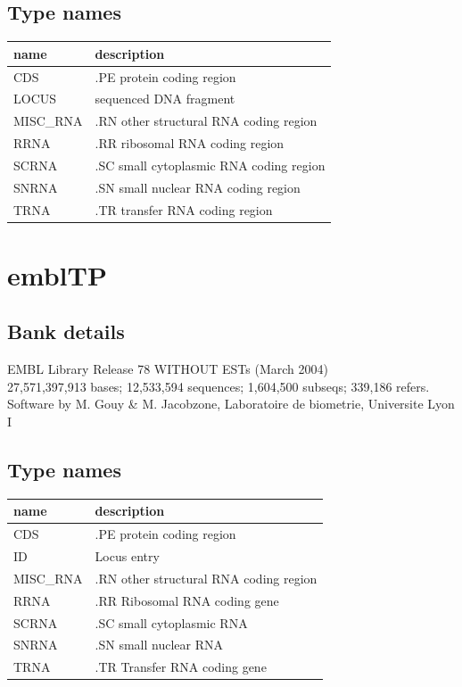 \documentclass{article}
\begin{document}
\begin{Schunk}
\subsection{Type names}
\noindent\begin{tabular}{ll}
\hline \hline
name & description\\
\hline
CDS & .PE protein coding region \\
LOCUS & sequenced DNA fragment \\
MISC\_RNA & .RN other structural RNA coding region \\
RRNA & .RR ribosomal RNA coding region \\
SCRNA & .SC small cytoplasmic RNA coding region \\
SNRNA & .SN small nuclear RNA coding region \\
TRNA & .TR transfer RNA coding region \\
\hline \hline
\end{tabular}

\section{ emblTP }
\subsection{Bank details}
EMBL Library Release 78 WITHOUT ESTs  (March 2004)\\
27,571,397,913 bases; 12,533,594 sequences; 1,604,500 subseqs; 339,186 refers.\\
Software by M. Gouy \& M. Jacobzone, Laboratoire de biometrie, Universite Lyon I

\subsection{Type names}
\noindent\begin{tabular}{ll}
\hline \hline
name & description\\
\hline
CDS & .PE protein coding region \\
ID & Locus entry \\
MISC\_RNA & .RN other structural RNA coding region \\
RRNA & .RR Ribosomal RNA coding gene \\
SCRNA & .SC small cytoplasmic RNA \\
SNRNA & .SN small nuclear RNA \\
TRNA & .TR Transfer RNA coding gene \\
\hline \hline
\end{tabular}


\end{Schunk}
\end{document}
